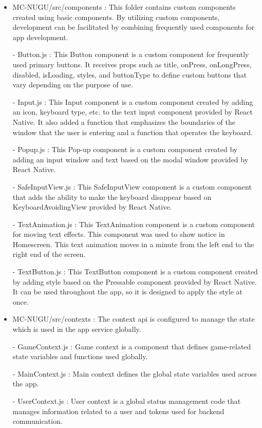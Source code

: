 \documentclass[conference]{IEEEtran}
\begin{document}
\begin{itemize}
                \item MC-NUGU/src/components : This folder contains custom components created using basic components. By utilizing custom components, development can be facilitated by combining frequently used components for app development.
                    \item[-] Button.js : This Button component is a custom component for frequently used primary buttons. It receives props such as title, onPress, onLongPress, disabled, isLoading, styles, and buttonType to define custom buttons that vary depending on the purpose of use.
                    \item[-] Input.js : This Input component is a custom component created by adding an icon, keyboard type, etc. to the text input component provided by React Native. It also added a function that emphasizes the boundaries of the window that the user is entering and a function that operates the keyboard.
                    \item[-] Popup.js : This Pop-up component is a custom component created by adding an input window and text based on the modal window provided by React Native.
                    \item[-] SafeInputView.js : This SafeInputView component is a custom component that adds the ability to make the keyboard disappear based on KeyboardAvoidingView provided by React Native.
                    \item[-] TextAnimation.js : This TextAnimation component is a custom component for moving text effects. This component was used to show notice in Homescreen. This text animation moves in a minute from the left end to the right end of the screen.
                    \item[-] TextButton.js : This TextButton component is a custom component created by adding style based on the Pressable component provided by React Native. It can be used throughout the app, so it is designed to apply the style at once.
                \vspace{3mm}
                
                \item MC-NUGU/src/contexts : The context api is configured to manage the state which is used in the app service globally.
                    \item[-] GameContext.js : Game context is a component that defines game-related state variables and functions used globally.
                    \item[-] MainContext.js : Main context defines the global state variables used across the app.
                    \item[-] UserContext.js : User context is a global status management code that manages information related to a user and tokens used for backend communication.
                \vspace{3mm}
                

\end{itemize}
\end{document}
